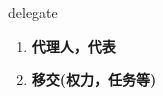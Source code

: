 
\begin{frame}
{\huge delegate}
\begin{center}
\begin{enumerate}\Large
  \item \textbf{代理人，代表}
  \item \textbf{移交(权力，任务等)}
\end{enumerate}
\end{center}
\end{frame}
